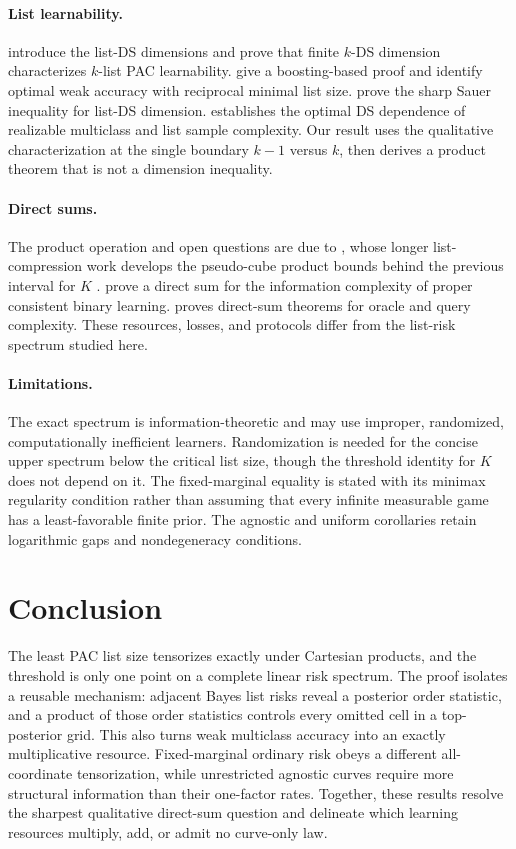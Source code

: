 \documentclass{article}
\theoremstyle{definition}
\theoremstyle{remark}
\newcommand{\1}{\mathbf 1}
\begin{document}
\paragraph{List learnability.}
\citet{charikar2023characterization} introduce the list-DS dimensions and prove that finite \(k\)-DS dimension characterizes \(k\)-list PAC learnability. \citet{brukhim2023boosting} give a boosting-based proof and identify optimal weak accuracy with reciprocal minimal list size. \citet{hanneke2026sauer} prove the sharp Sauer inequality for list-DS dimension. \citet{pabbaraju2026optimal} establishes the optimal DS dependence of realizable multiclass and list sample complexity. Our result uses the qualitative characterization at the single boundary \(k-1\) versus \(k\), then derives a product theorem that is not a dimension inequality.

\paragraph{Direct sums.}
The product operation and open questions are due to \citet{hanneke2024direct}, whose longer list-compression work develops the pseudo-cube product bounds behind the previous interval for \(K\) \citep{hanneke2024compression}. \citet{nachum2018information} prove a direct sum for the information complexity of proper consistent binary learning. \citet{suruga2025direct} proves direct-sum theorems for oracle and query complexity. These resources, losses, and protocols differ from the list-risk spectrum studied here.

\paragraph{Limitations.}
The exact spectrum is information-theoretic and may use improper, randomized, computationally inefficient learners. Randomization is needed for the concise upper spectrum below the critical list size, though the threshold identity for \(K\) does not depend on it. The fixed-marginal equality is stated with its minimax regularity condition rather than assuming that every infinite measurable game has a least-favorable finite prior. The agnostic and uniform corollaries retain logarithmic gaps and nondegeneracy conditions.

\section{Conclusion}

The least PAC list size tensorizes exactly under Cartesian products, and the threshold is only one point on a complete linear risk spectrum. The proof isolates a reusable mechanism: adjacent Bayes list risks reveal a posterior order statistic, and a product of those order statistics controls every omitted cell in a top-posterior grid. This also turns weak multiclass accuracy into an exactly multiplicative resource. Fixed-marginal ordinary risk obeys a different all-coordinate tensorization, while unrestricted agnostic curves require more structural information than their one-factor rates. Together, these results resolve the sharpest qualitative direct-sum question and delineate which learning resources multiply, add, or admit no curve-only law.
\end{document}
